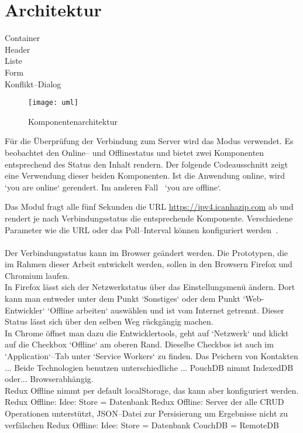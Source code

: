 \section{Architektur}
Container\\
Header\\
Liste\\
Form\\
Konflikt--Dialog\\
\begin{figure}[H]
  \texttt{[image: uml]}
  \grayRule
  \caption{Komponentenarchitektur}
  \label{fig:uml}
\end{figure}
%
%
Für die Überprüfung der Verbindung zum Server wird das Modus  verwendet. Es beobachtet den Online-- und Offlinestatus und bietet zwei Komponenten entsprechend des Status den Inhalt rendern. Der folgende Codeausschnitt zeigt eine Verwendung dieser beiden Komponenten. Ist die Anwendung online, wird `you are online` gerendert. Im anderen Fall ~`you are offline`.
\begin{center}

\end{center}
Das Modul fragt alle fünf Sekunden die URL \url{https://ipv4.icanhazip.com} ab und rendert je nach Verbindungsstatus die entsprechende Komponente. Verschiedene Parameter wie die URL oder das Poll--Interval können konfiguriert werden~\cite{react-detect}.\\\\
Der Verbindungsstatus kann im Browser geändert werden. Die Prototypen, die im Rahmen dieser Arbeit entwickelt werden, sollen in den Browsern Firefox und Chromium laufen.\\
In Firefox lässt sich der Netzwerkstatus über das Einstellungsmenü ändern. Dort kann man entweder unter dem Punkt `Sonstiges` oder dem Punkt `Web-Entwickler` `Offline arbeiten` auswählen und ist vom Internet getrennt. Dieser Status lässt sich über den selben Weg rückgängig machen.\\
In Chrome öffnet man dazu die Entwicklertools, geht auf `Netzwerk` und klickt auf die Checkbox `Offline` am oberen Rand. Dieselbe Checkbos ist auch im `Application`--Tab unter `Service Workers` zu finden.
%
%
Das Peichern von Kontakten ...
Beide Technologien benutzen unterschiedliche ... 
PouchDB nimmt IndexedDB oder... Browserabhängig.\\
Redux Offline nimmt per default localStorage, das kann aber konfiguriert werden.
Redux Offline: Idee: Store = Datenbank
%
%
Redux Offline: Server der alle \gls{CRUD} Operationen unterstützt,
\gls{JSON}--Datei zur Persisierung um Ergebnisse nicht zu verfälschen 
Redux Offline: Idee: Store = Datenbank
CouchDB = RemoteDB\\
%
%
